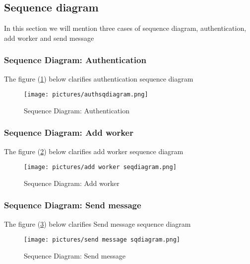 \documentclass[12pt]{report}
\begin{document}
\subsection{Sequence diagram}
In this section we will mention three cases of sequence diagram, authentication, add worker and send message
\subsubsection{Sequence Diagram: Authentication}
The figure (\ref{fig:authseqdiagram}) below clarifies authentication sequence diagram

\begin{figure}[!htbp]

        \centering
    \texttt{[image: pictures/authsqdiagram.png]}
    \caption{Sequence Diagram: Authentication}
    \label{fig:authseqdiagram}
\end{figure}

\pagebreak
\subsubsection{Sequence Diagram: Add worker}
The figure (\ref{fig:addworkerseqdiagram}) below clarifies add worker sequence diagram

\begin{figure}[!htbp]

        \centering
    \texttt{[image: pictures/add worker seqdiagram.png]}
    \caption{Sequence Diagram: Add worker}
    \label{fig:addworkerseqdiagram}
\end{figure}
\pagebreak

\subsubsection{Sequence Diagram: Send message}
The figure (\ref{fig:sendmsgseqdiagram}) below clarifies Send message sequence diagram

\begin{figure}[!htbp]

        \centering
    \texttt{[image: pictures/send message sqdiagram.png]}
    \caption{Sequence Diagram: Send message}
    \label{fig:sendmsgseqdiagram}
\end{figure}




\pagebreak
\end{document}
